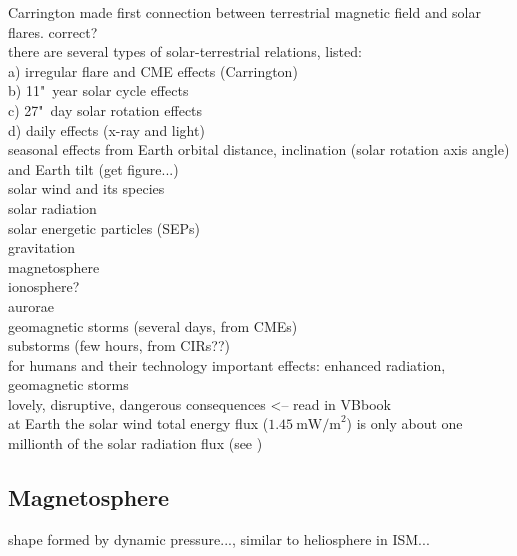 Carrington made first connection between terrestrial magnetic field and solar flares. correct?\\

there are several types of solar-terrestrial relations, \citet{Bartels1962} listed:\\	%
a) irregular flare and CME effects (Carrington)\\
b) 11"~year solar cycle effects\\
c) 27"~day solar rotation effects\\
d) daily effects (x-ray and light)\\

seasonal effects from Earth orbital distance, inclination (solar rotation axis angle) and Earth tilt (get figure...)\\

solar wind and its species\\
solar radiation\\
solar energetic particles (SEPs)\\
gravitation\\

magnetosphere\\
ionosphere?\\
aurorae\\
geomagnetic storms (several days, from CMEs)\\
substorms (few hours, from CIRs??)\\

for humans and their technology important effects: enhanced radiation, geomagnetic storms\\
lovely, disruptive, dangerous consequences <-- read in VBbook\\

at Earth the solar wind total energy flux ($1.45~\text{mW/m}^2$) is only about one millionth of the solar radiation flux (see \citet[p.~153]{Schwenn1990})\\


\subsection{Magnetosphere}
\label{sec:magnetosphere}

shape formed by dynamic pressure..., similar to heliosphere in ISM...\\


